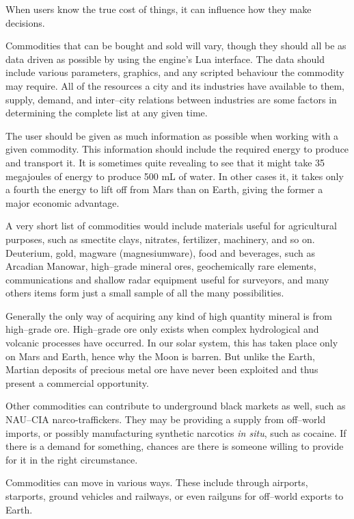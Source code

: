 When users know the true cost of things, it can influence how they make decisions.

Commodities that can be bought and sold will vary, though they should all be as data driven as possible by using the engine's Lua interface. The data should include various parameters, graphics, and any scripted behaviour the commodity may require. All of the resources a city and its industries have available to them, supply, demand, and inter--city relations between industries are some factors in determining the complete list at any given time.

The user should be given as much information as possible when working with a given commodity. This information should include the required energy to produce and transport it. It is sometimes quite revealing to see that it might take 35 megajoules of energy to produce 500 mL of water. In other cases it, it takes only a fourth the energy to lift off from Mars than on Earth, giving the former a major economic advantage.

A very short list of commodities would include materials useful for agricultural purposes, such as smectite clays, nitrates, fertilizer, machinery, and so on. Deuterium, gold, magware (magnesiumware), food and beverages, such as Arcadian Manowar, high--grade mineral ores, geochemically rare elements, communications and shallow radar equipment useful for surveyors, and many others items form just a small sample of all the many possibilities.

Generally the only way of acquiring any kind of high quantity mineral is from high--grade ore. High--grade ore only exists when complex hydrological and volcanic processes have occurred. In our solar system, this has taken place only on Mars and Earth, hence why the Moon is barren. But unlike the Earth, Martian deposits of precious metal ore have never been exploited and thus present a commercial opportunity.

Other commodities can contribute to underground black markets as well, such as NAU--CIA narco-traffickers. They may be providing a supply from off--world imports, or possibly manufacturing synthetic narcotics {\it in situ}, such as cocaine. If there is a demand for something, chances are there is someone willing to provide for it in the right circumstance.

Commodities can move in various ways. These include through airports, starports, ground vehicles and railways, or even railguns for off--world exports to Earth.

